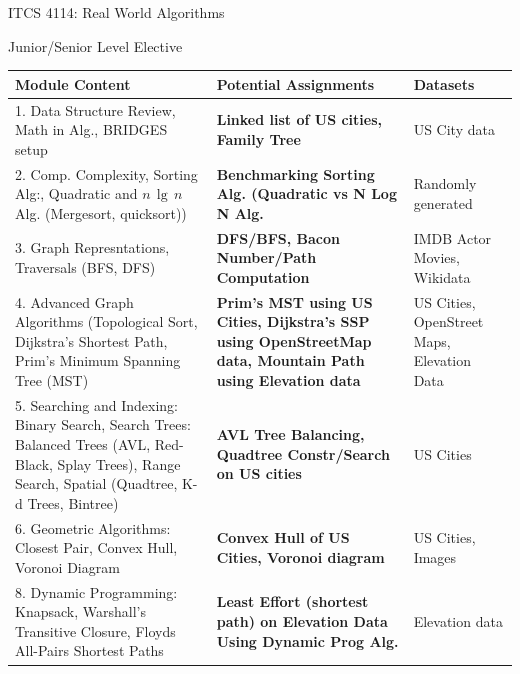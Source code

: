 \documentclass[aspectratio=169]{beamer}
\begin{document}
\begin{frame}{ITCS 4114: Real World Algorithms}
\begin{block}{Junior/Senior Level Elective}
\begin{table}
\scriptsize
\begin{tabularx}{\textwidth}{p{}p{}p{}}
\multicolumn{1}{l}{\textbf{Module Content}}&\multicolumn{1}{l}{\textbf{Potential Assignments}}& \multicolumn{1}{l}{\textbf{Datasets}}\\ \hline
%
1. Data Structure Review, Math in Alg., BRIDGES setup & 
\textbf{Linked list of US cities, Family Tree} & 
US City data\\ \hline 
%
2. Comp. Complexity, Sorting Alg:, Quadratic and $n\, \lg \,n$ Alg. (Mergesort, quicksort)) & 
\textbf{Benchmarking Sorting Alg. (Quadratic vs N Log N Alg.} & Randomly generated\\ \hline
3. Graph Represntations, Traversals (BFS, DFS) & 
\textbf{DFS/BFS, Bacon Number/Path Computation} & IMDB Actor Movies, Wikidata\\\hline 
%
4. Advanced Graph Algorithms  (Topological Sort, Dijkstra's Shortest Path, Prim's Minimum Spanning Tree (MST) & 
\textbf{Prim's MST using US Cities, Dijkstra's SSP using OpenStreetMap data, Mountain Path using Elevation data} & 
US Cities, OpenStreet Maps, Elevation Data\\ \hline 
%
5. Searching and Indexing: Binary Search, Search Trees:  Balanced Trees (AVL, Red-Black, Splay Trees), Range Search, Spatial (Quadtree, K-d Trees, Bintree) &
\textbf{AVL Tree Balancing, Quadtree Constr/Search on US cities}  & 
US Cities\\ \hline
%
6. Geometric Algorithms: Closest Pair, Convex Hull, Voronoi Diagram &  
\textbf{Convex Hull of US Cities, Voronoi diagram} & 
US Cities, Images\\ \hline
%
8. Dynamic Programming: Knapsack, Warshall's Transitive Closure, Floyds All-Pairs Shortest Paths & 
\textbf{Least Effort (shortest path) on Elevation Data Using Dynamic Prog Alg.} &
Elevation data \\\hline
\end{tabularx}
\end{table}
\end{block}
\end{frame}
\end{document}
